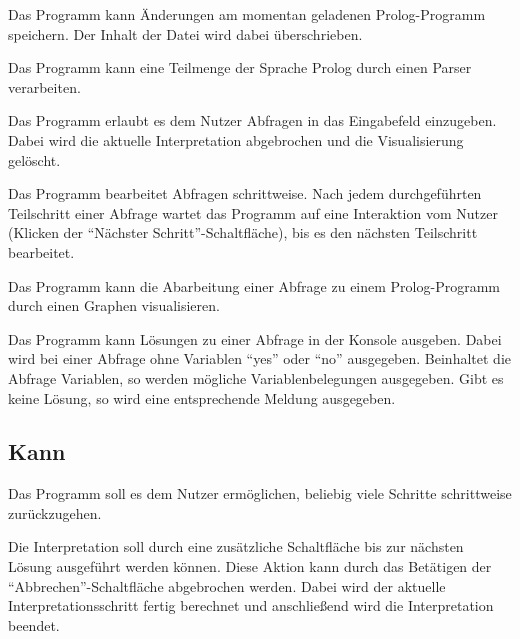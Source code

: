 \documentclass[parskip=full,11pt,twoside]{scrartcl}
\begin{document}
Das Programm kann Änderungen am momentan geladenen Prolog-Programm speichern. Der Inhalt der Datei wird dabei überschrieben.


Das Programm kann eine Teilmenge der Sprache Prolog durch einen Parser verarbeiten.


Das Programm erlaubt es dem Nutzer Abfragen in das Eingabefeld einzugeben. Dabei wird die aktuelle Interpretation abgebrochen und die Visualisierung gelöscht.


Das Programm bearbeitet Abfragen schrittweise. Nach jedem durchgeführten Teilschritt einer Abfrage wartet das Programm auf eine Interaktion vom Nutzer (Klicken der \enquote{Nächster Schritt}-Schaltfläche), bis es den nächsten Teilschritt bearbeitet.


Das Programm kann die Abarbeitung einer Abfrage zu einem Prolog-Programm durch einen Graphen visualisieren.


Das Programm kann Lösungen zu einer Abfrage in der Konsole ausgeben. Dabei wird bei einer Abfrage ohne Variablen \enquote{yes} oder \enquote{no} ausgegeben. Beinhaltet die Abfrage Variablen, so werden mögliche Variablenbelegungen ausgegeben. Gibt es keine Lösung, so wird eine entsprechende Meldung ausgegeben.

\subsection{Kann}


Das Programm soll es dem Nutzer ermöglichen, beliebig viele Schritte schrittweise zurückzugehen.


Die Interpretation soll durch eine zusätzliche Schaltfläche bis zur nächsten Lösung ausgeführt werden können. Diese Aktion kann durch das Betätigen der \enquote{Abbrechen}-Schaltfläche abgebrochen werden. Dabei wird der aktuelle Interpretationsschritt fertig berechnet und anschließend wird die Interpretation beendet.
\end{document}
